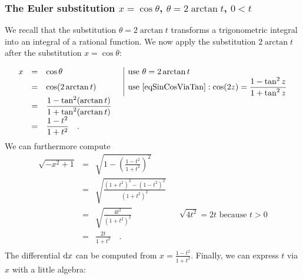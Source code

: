 \documentclass[12pt]{book}
\begin{document}
\subsubsection{The Euler substitution $x=\cos \theta$, $\theta=2\arctan t$, $ 0<t $}
We recall that the substitution $\theta = 2\arctan t$ transforms a trigonometric integral into an integral of a rational function. We now apply the substitution $2\arctan t$ after the substitution $x=\cos \theta$:

\begin{equation*}
\begin{array}{rcll|l}
x&=&\displaystyle \cos \theta &&\text{use } \theta=2\arctan t\\
&=&\displaystyle \cos (2\arctan t) &&\text{use } \eqref{eqSinCosViaTan}: \displaystyle \cos (2z) = \frac{ 1-\tan^2 z }{1+ \tan^2 z}\\
&=&\displaystyle \frac{1-\tan^2(\arctan t)}{1+\tan^2( \arctan t)} \\
&=&\displaystyle \frac{1-t^2}{1+t^2} \quad .
\end{array}
\end{equation*}
We can furthermore compute
\begin{equation}\label{eqsqrt1minusxsquaredE2}
\begin{array}{rcll|l}
\sqrt{-x^2+1 }&=&\displaystyle \sqrt{1- \left(\frac{1-t^2}{1+t^2}\right)^2}\\
&=&\displaystyle \sqrt{\frac{(1+t^2)^2-(1-t^2)^2}{(1+t^2)^2} }\\
&=&\displaystyle \sqrt{\frac{4t^2}{(1+t^2)^2}} &&\displaystyle \sqrt{4t^2}=2t\text{ because } t>0\\
&=&\displaystyle \frac{2t}{1+t^2}\quad .\\
\end{array}
\end{equation}
The differential ${\normalfont \text{d}} x$ can be computed from $x=\frac{1-t^2}{1+t^2}$. Finally, we can express $t$ via $x$ with a little algebra:
\end{document}

